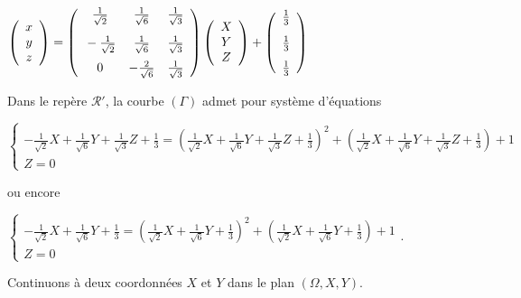 {{\begin{center}
$\left(
\begin{array}{c}
x\\
y\\
z
\end{array}
\right)=\left(
\begin{array}{ccc}
\frac{1}{\sqrt{2}}&\frac{1}{\sqrt{6}}&\frac{1}{\sqrt{3}}\\
\rule[-4mm]{0mm}{10mm}-\frac{1}{\sqrt{2}}&\frac{1}{\sqrt{6}}&\frac{1}{\sqrt{3}}\\
0&-\frac{2}{\sqrt{6}}&\frac{1}{\sqrt{3}}
\end{array}
\right)\left(
\begin{array}{c}
X\\
Y\\
Z
\end{array}
\right)+\left(
\begin{array}{c}
\frac{1}{3}\\
\rule[-4mm]{0mm}{10mm}\frac{1}{3}\\
\frac{1}{3}
\end{array}
\right)$
\end{center}

Dans le repère $\mathcal{R}'$, la courbe $(\Gamma)$ admet pour système d'équations 

\begin{center}
$\left\{
\begin{array}{l}
-\frac{1}{\sqrt{2}}X+\frac{1}{\sqrt{6}}Y+\frac{1}{\sqrt{3}}Z+\frac{1}{3}=\left(\frac{1}{\sqrt{2}}X+\frac{1}{\sqrt{6}}Y+\frac{1}{\sqrt{3}}Z+\frac{1}{3}\right)^2 +\left(\frac{1}{\sqrt{2}}X+\frac{1}{\sqrt{6}}Y+\frac{1}{\sqrt{3}}Z+\frac{1}{3}\right)+ 1\\
Z=0
\end{array}
\right.$
\end{center}

ou encore

\begin{center}
$\left\{
\begin{array}{l}
-\frac{1}{\sqrt{2}}X+\frac{1}{\sqrt{6}}Y+\frac{1}{3}=\left(\frac{1}{\sqrt{2}}X+\frac{1}{\sqrt{6}}Y+\frac{1}{3}\right)^2 +\left(\frac{1}{\sqrt{2}}X+\frac{1}{\sqrt{6}}Y+\frac{1}{3}\right)+ 1\\
Z=0
\end{array}
\right.$.
\end{center}

Continuons à deux coordonnées $X$ et $Y$ dans le plan $(\Omega,X,Y)$.

}}
